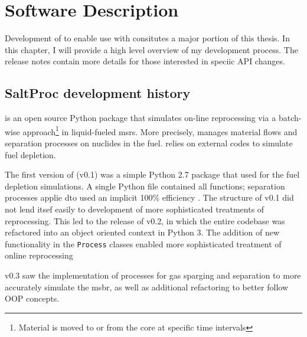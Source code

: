 \chapter{Software Description}
Development of \SaltProc to enable use with \OpenMC consitutes a major portion
of this thesis. In this chapter, I will provide a high level overview
of my development process. The release notes contain more details for those
interested in speciic API changes. 

\section{SaltProc development history}%
\label{sub:saltproc-hisory}

\SaltProc\cite{rykhlevskii_saltproc_2018} is an open source Python package that
simulates on-line reprocessing via a batch-wise approach\footnote{Material is
moved to or from the core at specific time intervals} in liquid-fueled
\Gls{msr}s. More precisely, \SaltProc manages material flows and separation
processes on nuclides in the fuel. \SaltProc relies on external codes to simulate
fuel depletion.

The first version of \SaltProc (v0.1) was a simple Python 2.7 package that used
\SerpentTWO for the fuel depletion simulations. A single Python file contained
all functions; separation processes applie dto  used an implicit 100\%
efficiency \cite{rykhlevskii_advanced_2018}. The structure of \SaltProc v0.1 did
not lend itsef easily to development of more sophisticated treatments of
reprocessing. This led to the release of \SaltProc v0.2, in which the entire
codebase was refactored into an object oriented context in Python 3. The
addition of new functionality in the \verb.Process. classes enabled more
sophisticated treatment of online reprocessing \cite{rykhlevskii_fuel_2020} 

\SaltProc v0.3 saw the implementation of processes for gas sparging and
separation to more accurately simulate the \gls{msbr}, as well as additional
refactoring to better follow OOP concepts.

